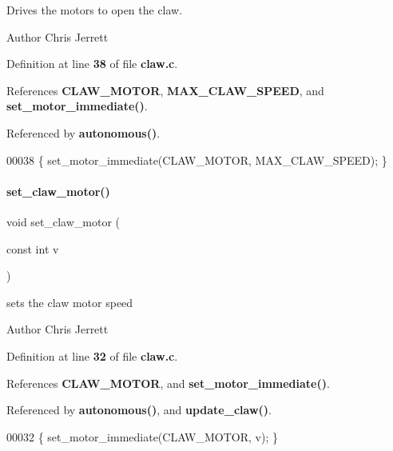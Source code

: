 Drives the motors to open the claw. 

\begin{DoxyAuthor}{Author}
Chris Jerrett 
\end{DoxyAuthor}


Definition at line \textbf{ 38} of file \textbf{ claw.\+c}.



References \textbf{ C\+L\+A\+W\+\_\+\+M\+O\+T\+OR}, \textbf{ M\+A\+X\+\_\+\+C\+L\+A\+W\+\_\+\+S\+P\+E\+ED}, and \textbf{ set\+\_\+motor\+\_\+immediate()}.



Referenced by \textbf{ autonomous()}.


\begin{DoxyCode}
00038 \{ set_motor_immediate(CLAW_MOTOR, MAX_CLAW_SPEED); \}
\end{DoxyCode}
\mbox{\label{a00008_a3a57f998b1884d39b0cc786689f7086f}} 
\paragraph{set\+\_\+claw\+\_\+motor()}
{\footnotesize\ttfamily void set\+\_\+claw\+\_\+motor (\begin{DoxyParamCaption}\item[{const int}]{v }\end{DoxyParamCaption})}



sets the claw motor speed 

\begin{DoxyAuthor}{Author}
Chris Jerrett 
\end{DoxyAuthor}


Definition at line \textbf{ 32} of file \textbf{ claw.\+c}.



References \textbf{ C\+L\+A\+W\+\_\+\+M\+O\+T\+OR}, and \textbf{ set\+\_\+motor\+\_\+immediate()}.



Referenced by \textbf{ autonomous()}, and \textbf{ update\+\_\+claw()}.


\begin{DoxyCode}
00032 \{ set_motor_immediate(CLAW_MOTOR, v); \}
\end{DoxyCode}
\mbox{\label{a00008_a0122b78972344264b8a276a559cfce4a}} 
